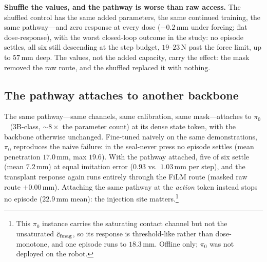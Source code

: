 \textbf{Shuffle the \chat{} values, and the pathway is worse than raw access.} The shuffled control
has the same added parameters, the same continued training, the same pathway---and zero
response at every dose ($-0.2$\,mm under forcing; flat dose-response), with the worst
closed-loop outcome in the study: no episode settles, all six still descending at the step
budget, $19$--$23$\,N past the force limit, up to $57$\,mm deep. The values, not the added capacity,
carry the effect: the mask removed the raw route, and the shuffled \chat{}
replaced it with nothing.

\subsection{The pathway attaches to another backbone}
\label{sec:offline-pi0}

The same pathway---same channels, same calibration, same mask---attaches to
$\pi_0$~\cite{pi0} ($3$B-class, ${\sim}8\times$ the parameter count) at its dense state token, with the
backbone otherwise unchanged. Fine-tuned naively on the same demonstrations, $\pi_0$
reproduces the naive failure: in the seal-never press no episode settles (mean penetration
$17.0$\,mm, max $19.6$). With the pathway attached, five of six settle (mean $7.2$\,mm) at equal
imitation error ($0.93$ vs.\ $1.03$\,mm per step), and the transplant response again runs
entirely through the FiLM route (masked raw route $+0.00$\,mm). Attaching the same pathway at
the \emph{action} token instead stops no episode ($22.9$\,mm mean): the injection site matters.\footnote{This $\pi_0$ instance carries the saturating contact
channel but not the unsaturated $\hat{c}_{\mathrm{fmag}}$, so its response is threshold-like
rather than dose-monotone, and one episode runs to $18.3$\,mm. Offline only; $\pi_0$ was not
deployed on the robot.}
